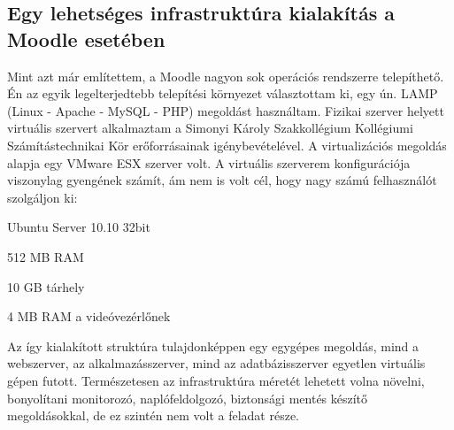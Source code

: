 \subsection{Egy lehetséges infrastruktúra kialakítás a Moodle esetében}

Mint azt már említettem, a Moodle nagyon sok operációs rendszerre telepíthető. Én az egyik legelterjedtebb telepítési környezet választottam ki, egy ún. LAMP (Linux - Apache - MySQL - PHP) megoldást használtam. Fizikai szerver helyett virtuális szervert alkalmaztam a Simonyi Károly Szakkollégium Kollégiumi Számítástechnikai Kör erőforrásainak igénybevételével. A virtualizációs megoldás alapja egy VMware ESX szerver volt.
A virtuális szerverem konfigurációja viszonylag gyengének számít, ám nem is volt cél, hogy nagy számú felhasználót szolgáljon ki:
\begin{sajat_itemize}
\item Ubuntu Server 10.10 32bit
\item 512 MB RAM
\item 10 GB tárhely
\item 4 MB RAM a videóvezérlőnek 
\end{sajat_itemize}
Az így kialakított struktúra tulajdonképpen egy egygépes megoldás, mind a webszerver, az alkalmazásszerver, mind az adatbázisszerver egyetlen virtuális gépen futott. Természetesen az infrastruktúra méretét lehetett volna növelni, bonyolítani monitorozó, naplófeldolgozó, biztonsági mentés készítő megoldásokkal, de ez szintén nem volt a feladat része.
